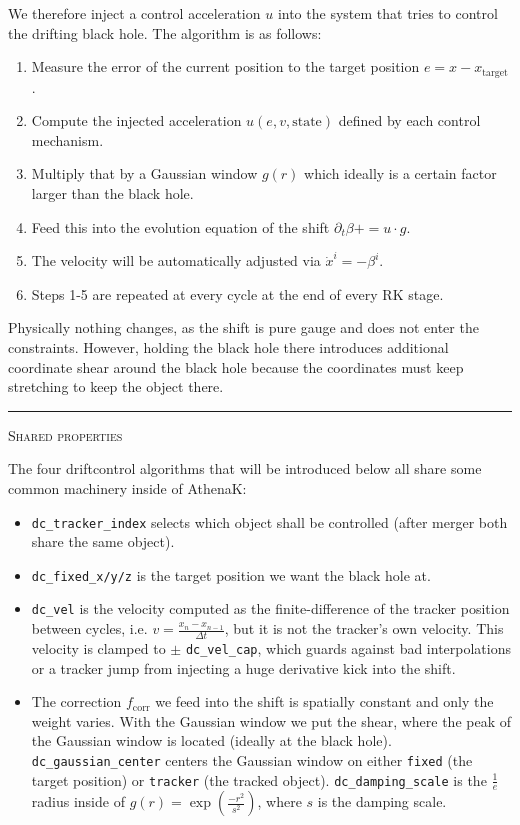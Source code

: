 \documentclass{article}
\newcommand{\var}[1]{%
  {\setlength{\fboxsep}{1.5pt}%
   \colorbox{varbg}{\textcolor{varfg}{\texttt{\small #1}}}}}
\newcommand{\step}[1]{%
  \par\medskip\noindent
  {\color{stepfg}\rule[-0.15ex]{2pt}{1.5ex}\hspace{0.5em}\scshape #1}%
  \hspace{0.75em}\ignorespaces}
\begin{document}
We therefore inject a control acceleration $u$ into the system that tries to control the drifting black hole. The algorithm is as follows:
\begin{enumerate}
  \item Measure the error of the current position to the target position $e=x-x_{\mathrm{target}}$.
  \item Compute the injected acceleration $u(e,v,\mathrm{state})$ defined by each control mechanism.
  \item Multiply that by a Gaussian window $g(r)$ which ideally is a certain factor larger than the black hole.
  \item Feed this into the evolution equation of the shift $\partial_t\beta+=u\cdot g$.
  \item The velocity will be automatically adjusted via $\Dot{x}^i=-\beta^i$.
  \item Steps 1-5 are repeated at every cycle at the end of every RK stage.
\end{enumerate}
Physically nothing changes, as the shift is pure gauge and does not enter the constraints. However, holding the black hole there introduces additional coordinate shear around
the black hole because the coordinates must keep stretching to keep the object there.
\step{Shared properties} The four driftcontrol algorithms that will be introduced below all share some common machinery inside of AthenaK:
\begin{itemize}
  \item \var{dc\_tracker\_index} selects which object shall be controlled (after merger both share the same object).
  \item \var{dc\_fixed\_x/y/z} is the target position we want the black hole at.
  \item \var{dc\_vel} is the velocity computed as the finite-difference of the tracker position between cycles, i.e. $v=\frac{x_n-x_{n-1}}{\Delta t}$, but it is not
  the tracker's own velocity. This velocity is clamped to $\pm$\var{dc\_vel\_cap}, which guards against bad interpolations or a tracker jump from injecting a
  huge derivative kick into the shift.
  \item The correction $f_{\mathrm{corr}}$ we feed into the shift is spatially constant and only the weight varies. With the Gaussian window we put the shear, where the
  peak of the Gaussian window is located (ideally at the black hole). \var{dc\_gaussian\_center} centers the Gaussian window on either \var{fixed} (the target position) or
  \var{tracker} (the tracked object). \var{dc\_damping\_scale} is the $\frac{1}{e}$ radius inside of $g(r)=\exp{\left(\frac{-r^2}{s^2}\right)}$, where $s$ is the damping scale.
\end{itemize}
\end{document}
